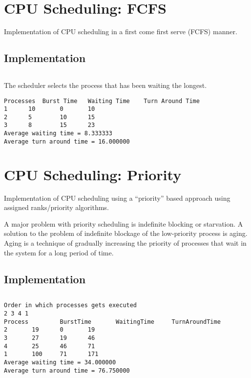 \section{CPU Scheduling: FCFS}
\label{sec:cpu-scheduling}

Implementation of CPU scheduling in a first come first serve (FCFS) manner.

\subsection{Implementation}

\inputminted[fontsize=\footnotesize,autogobble]{c}{code/fcfs.c}

The scheduler selects the process that has been waiting the longest.
\pagebreak

\begin{lstlisting}[style=output]
Processes  Burst Time   Waiting Time    Turn Around Time
1	   10		0		10
2	   5		10		15
3	   8		15		23
Average waiting time = 8.333333
Average turn around time = 16.000000
\end{lstlisting}

\section{CPU Scheduling: Priority}
\label{sec:cpu-scheduling-priority}

Implementation of CPU scheduling using a ``priority'' based approach using assigned ranks/priority algorithms.

A major problem with priority scheduling is indefinite blocking or starvation. A solution to the problem of indefinite blockage of the low-priority process is aging. Aging is a technique of gradually increasing the priority of processes that wait in the system for a long period of time.

\subsection{Implementation}

\inputminted[fontsize=\footnotesize,autogobble]{c}{code/priority.c}

\begin{lstlisting}[style=output]
Order in which processes gets executed
2 3 4 1 
Process         BurstTime       WaitingTime     TurnAroundTime
2		19		0		19
3		27		19		46
4		25		46		71
1		100		71		171
Average waiting time = 34.000000
Average turn around time = 76.750000
\end{lstlisting}

